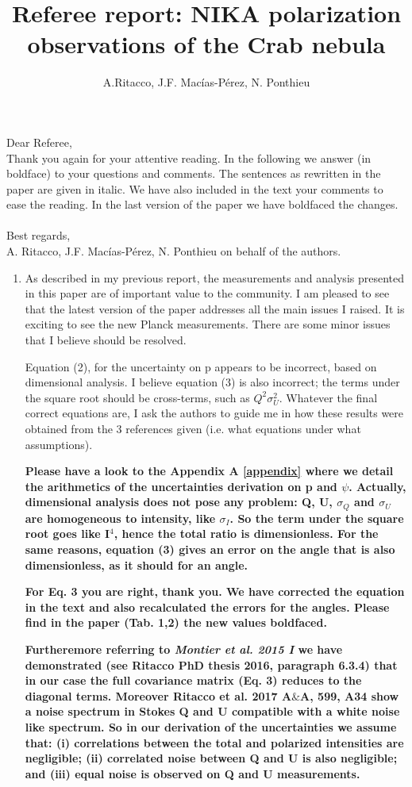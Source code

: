 \documentclass[12pt]{article}
\title{Referee report: NIKA polarization observations of the Crab nebula}
\author{A.Ritacco, J.F. Macías-Pérez, N. Ponthieu}
\begin{document}
\maketitle

\noindent Dear Referee,\\
Thank you again for your attentive reading. 
In the following we answer (in boldface) to your questions and comments.
The sentences as rewritten in the paper are given in italic.
We have also included in the text your comments to ease the reading. 
In the last version of the paper we have boldfaced the changes. \\  \\
Best regards,\\
A. Ritacco, J.F. Macías-Pérez, N. Ponthieu on behalf of the authors.


\begin{enumerate}
    \item 
{
As described in my previous report, the measurements and analysis 
presented in this paper are of important value to the community. I am 
pleased to see that the latest version of the paper addresses all the 
main issues I raised. It is exciting to see the new Planck 
measurements. There are some minor issues that I believe 
should be resolved. 
}

Equation (2), for the uncertainty on p appears to be incorrect, based 
on dimensional analysis. I believe equation (3) is also incorrect; 
the terms under the square root should be cross-terms, such as 
$Q^2\sigma_U^2$. Whatever the final correct equations are, I ask the 
authors to guide me in how these results were obtained from the 3 
references given (i.e. what equations under what assumptions).

{\bf Please have a look to the Appendix A \ref{appendix} where we detail the arithmetics of the uncertainties derivation on p and $\psi$. Actually, dimensional analysis does not pose any problem: Q, U, $\sigma_Q$ and $\sigma_U$ are homogeneous to intensity, like $\sigma_I$. So the term under the square root goes like I$^4$, hence the total ratio is dimensionless. For the same reasons, equation (3) gives an error on the angle that is also dimensionless, as it should for an angle.}

{\bf For Eq. 3 you are right, thank you. We have corrected the equation in the text and also recalculated the errors for the angles. Please find in the paper (Tab. 1,2) the new values boldfaced.}

{\bf Furtheremore referring to {\it Montier et al. 2015 I} we have demonstrated (see Ritacco PhD thesis 2016, paragraph 6.3.4) that in our case the full covariance matrix (Eq. 3) reduces to the diagonal terms. Moreover Ritacco et al. 2017 A$\&$A, 599, A34 show a noise spectrum in Stokes Q and U compatible with a white noise like spectrum. So in our derivation of the uncertainties we assume that: (i) correlations between the total and polarized intensities are negligible; (ii) correlated noise between Q and U is also negligible; and (iii) equal noise is observed on Q and U measurements.}



\end{enumerate}
\end{document}
